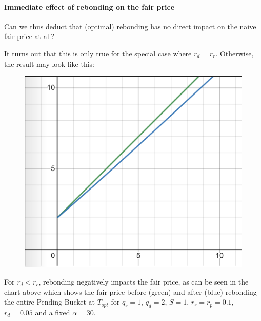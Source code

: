 \documentclass{article}
\begin{document}




\pagebreak

\paragraph{Immediate effect of rebonding on the fair price}
Can we thus deduct that (optimal) rebonding has no direct impact on the naive fair price at all?

It turns out that this is only true for the special case where $r_d = r_r$. Otherwise, the result may look like this:

\begin{figure}[h]
    \centering
    \includegraphics[width=0.5\linewidth]{./ChickenBonds_Whitepaper_rebonding.png}
\end{figure}

For $r_d < r_r$, rebonding negatively impacts the fair price, as can be seen in the chart above which shows the fair price before (green) and after (blue) rebonding the entire Pending Bucket at $T_{opt}$ for $q_r=1$, $q_d=2$, $S=1$, $r_r=r_p=0.1$, $r_d=0.05$ and a fixed $\alpha=30$. 
\end{document}
